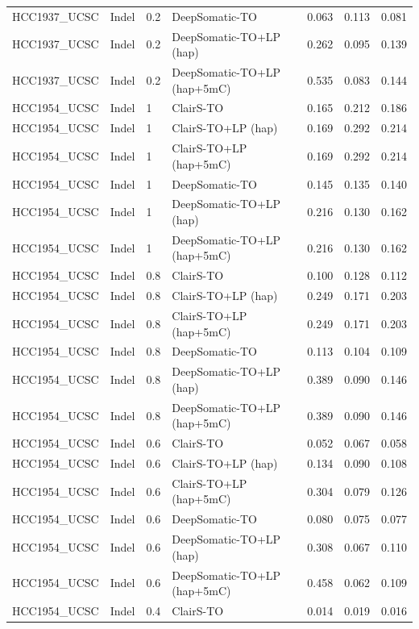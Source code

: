 \documentclass[pdflatex,sn-nature]{sn-jnl}
\begin{document}
{\begin{longtable}{@{}llllccc@{}}
  HCC1937\_UCSC & Indel & 0.2 & DeepSomatic-TO & 0.063 & 0.113 & 0.081 \\
  HCC1937\_UCSC & Indel & 0.2 & DeepSomatic-TO+LP (hap) & 0.262 & 0.095 & 0.139 \\
  HCC1937\_UCSC & Indel & 0.2 & DeepSomatic-TO+LP (hap+5mC) & 0.535 & 0.083 & 0.144 \\
  HCC1954\_UCSC & Indel & 1 & ClairS-TO & 0.165 & 0.212 & 0.186 \\
  HCC1954\_UCSC & Indel & 1 & ClairS-TO+LP (hap) & 0.169 & 0.292 & 0.214 \\
  HCC1954\_UCSC & Indel & 1 & ClairS-TO+LP (hap+5mC) & 0.169 & 0.292 & 0.214 \\
  HCC1954\_UCSC & Indel & 1 & DeepSomatic-TO & 0.145 & 0.135 & 0.140 \\
  HCC1954\_UCSC & Indel & 1 & DeepSomatic-TO+LP (hap) & 0.216 & 0.130 & 0.162 \\
  HCC1954\_UCSC & Indel & 1 & DeepSomatic-TO+LP (hap+5mC) & 0.216 & 0.130 & 0.162 \\
  HCC1954\_UCSC & Indel & 0.8 & ClairS-TO & 0.100 & 0.128 & 0.112 \\
  HCC1954\_UCSC & Indel & 0.8 & ClairS-TO+LP (hap) & 0.249 & 0.171 & 0.203 \\
  HCC1954\_UCSC & Indel & 0.8 & ClairS-TO+LP (hap+5mC) & 0.249 & 0.171 & 0.203 \\
  HCC1954\_UCSC & Indel & 0.8 & DeepSomatic-TO & 0.113 & 0.104 & 0.109 \\
  HCC1954\_UCSC & Indel & 0.8 & DeepSomatic-TO+LP (hap) & 0.389 & 0.090 & 0.146 \\
  HCC1954\_UCSC & Indel & 0.8 & DeepSomatic-TO+LP (hap+5mC) & 0.389 & 0.090 & 0.146 \\
  HCC1954\_UCSC & Indel & 0.6 & ClairS-TO & 0.052 & 0.067 & 0.058 \\
  HCC1954\_UCSC & Indel & 0.6 & ClairS-TO+LP (hap) & 0.134 & 0.090 & 0.108 \\
  HCC1954\_UCSC & Indel & 0.6 & ClairS-TO+LP (hap+5mC) & 0.304 & 0.079 & 0.126 \\
  HCC1954\_UCSC & Indel & 0.6 & DeepSomatic-TO & 0.080 & 0.075 & 0.077 \\
  HCC1954\_UCSC & Indel & 0.6 & DeepSomatic-TO+LP (hap) & 0.308 & 0.067 & 0.110 \\
  HCC1954\_UCSC & Indel & 0.6 & DeepSomatic-TO+LP (hap+5mC) & 0.458 & 0.062 & 0.109 \\
  HCC1954\_UCSC & Indel & 0.4 & ClairS-TO & 0.014 & 0.019 & 0.016 \\

\end{longtable}}
\end{document}
